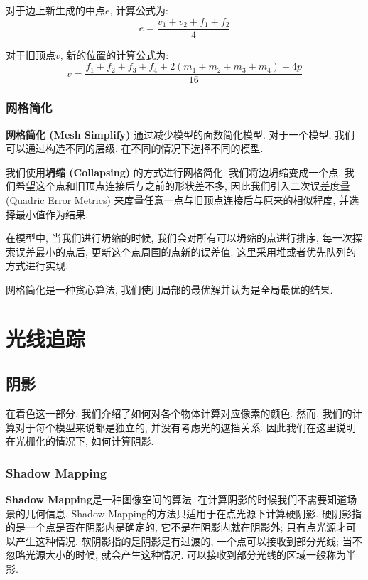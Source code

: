 \documentclass[openany]{progbookcn}
\begin{document}
对于边上新生成的中点$e$, 计算公式为:
\begin{equation}
	e=\frac{v_1+v_2+f_1+f_2}{4}
\end{equation}

对于旧顶点$v$, 新的位置的计算公式为: 
\begin{equation}
	v=\frac{f_1+f_2+f_3+f_4+2(m_1+m_2+m_3+m_4)+4p}{16}
\end{equation}

\section{网格简化}
\textbf{网格简化 (Mesh Simplify) }通过减少模型的面数简化模型. 对于一个模型, 我们可以通过构造不同的层级, 在不同的情况下选择不同的模型. 

我们使用\textbf{坍缩 (Collapsing) }的方式进行网格简化. 我们将边坍缩变成一个点. 我们希望这个点和旧顶点连接后与之前的形状差不多, 因此我们引入二次误差度量 (Quadric Error Metrics) 来度量任意一点与旧顶点连接后与原来的相似程度, 并选择最小值作为结果. 

在模型中, 当我们进行坍缩的时候, 我们会对所有可以坍缩的点进行排序, 每一次探索误差最小的点后, 更新这个点周围的点新的误差值. 这里采用堆或者优先队列的方式进行实现. 

网格简化是一种贪心算法, 我们使用局部的最优解并认为是全局最优的结果. 

\part{光线追踪}

\chapter{阴影}

在着色这一部分, 我们介绍了如何对各个物体计算对应像素的颜色. 然而, 我们的计算对于每个模型来说都是独立的, 并没有考虑光的遮挡关系. 因此我们在这里说明在光栅化的情况下, 如何计算阴影. 

\section{Shadow Mapping}
\textbf{Shadow Mapping}是一种图像空间的算法. 在计算阴影的时候我们不需要知道场景的几何信息. Shadow Mapping的方法只适用于在点光源下计算硬阴影. 硬阴影指的是一个点是否在阴影内是确定的, 它不是在阴影内就在阴影外; 只有点光源才可以产生这种情况. 软阴影指的是阴影是有过渡的, 一个点可以接收到部分光线; 当不忽略光源大小的时候, 就会产生这种情况. 可以接收到部分光线的区域一般称为半影. 
\end{document}
